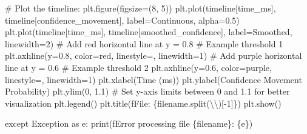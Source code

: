 \documentclass[
  letterpaper,
  DIV=11,
  numbers=noendperiod]{scrreprt}
\newenvironment{Shaded}{\begin{snugshade}}{\end{snugshade}}
\newcommand{\BuiltInTok}[1]{\textcolor[rgb]{0.00,0.23,0.31}{#1}}
\newcommand{\CharTok}[1]{\textcolor[rgb]{0.13,0.47,0.30}{#1}}
\newcommand{\CommentTok}[1]{\textcolor[rgb]{0.37,0.37,0.37}{#1}}
\newcommand{\ControlFlowTok}[1]{\textcolor[rgb]{0.00,0.23,0.31}{#1}}
\newcommand{\DecValTok}[1]{\textcolor[rgb]{0.68,0.00,0.00}{#1}}
\newcommand{\FloatTok}[1]{\textcolor[rgb]{0.68,0.00,0.00}{#1}}
\newcommand{\ImportTok}[1]{\textcolor[rgb]{0.00,0.46,0.62}{#1}}
\newcommand{\NormalTok}[1]{\textcolor[rgb]{0.00,0.23,0.31}{#1}}
\newcommand{\OperatorTok}[1]{\textcolor[rgb]{0.37,0.37,0.37}{#1}}
\newcommand{\PreprocessorTok}[1]{\textcolor[rgb]{0.68,0.00,0.00}{#1}}
\newcommand{\SpecialCharTok}[1]{\textcolor[rgb]{0.37,0.37,0.37}{#1}}
\newcommand{\SpecialStringTok}[1]{\textcolor[rgb]{0.13,0.47,0.30}{#1}}
\newcommand{\StringTok}[1]{\textcolor[rgb]{0.13,0.47,0.30}{#1}}
\begin{document}
\begin{Shaded}
\begin{Highlighting}[]
        \CommentTok{\# Plot the timeline:}
\NormalTok{        plt.figure(figsize}\OperatorTok{=}\NormalTok{(}\DecValTok{8}\NormalTok{, }\DecValTok{5}\NormalTok{))}
\NormalTok{        plt.plot(timeline[}\StringTok{\textquotesingle{}time\_ms\textquotesingle{}}\NormalTok{], timeline[}\StringTok{\textquotesingle{}confidence\_movement\textquotesingle{}}\NormalTok{], label}\OperatorTok{=}\StringTok{\textquotesingle{}Continuous\textquotesingle{}}\NormalTok{, alpha}\OperatorTok{=}\FloatTok{0.5}\NormalTok{)}
\NormalTok{        plt.plot(timeline[}\StringTok{\textquotesingle{}time\_ms\textquotesingle{}}\NormalTok{], timeline[}\StringTok{\textquotesingle{}smoothed\_confidence\textquotesingle{}}\NormalTok{], label}\OperatorTok{=}\StringTok{\textquotesingle{}Smoothed\textquotesingle{}}\NormalTok{, linewidth}\OperatorTok{=}\DecValTok{2}\NormalTok{)}
        \CommentTok{\# Add red horizontal line at y = 0.8    \# Example threshold 1}
\NormalTok{        plt.axhline(y}\OperatorTok{=}\FloatTok{0.8}\NormalTok{, color}\OperatorTok{=}\StringTok{\textquotesingle{}red\textquotesingle{}}\NormalTok{, linestyle}\OperatorTok{=}\StringTok{\textquotesingle{}{-}{-}\textquotesingle{}}\NormalTok{, linewidth}\OperatorTok{=}\DecValTok{1}\NormalTok{)}
        \CommentTok{\# Add purple horizontal line at y = 0.6    \# Example threshold 2}
\NormalTok{        plt.axhline(y}\OperatorTok{=}\FloatTok{0.6}\NormalTok{, color}\OperatorTok{=}\StringTok{\textquotesingle{}purple\textquotesingle{}}\NormalTok{, linestyle}\OperatorTok{=}\StringTok{\textquotesingle{}{-}{-}\textquotesingle{}}\NormalTok{, linewidth}\OperatorTok{=}\DecValTok{1}\NormalTok{)}
\NormalTok{        plt.xlabel(}\StringTok{\textquotesingle{}Time (ms)\textquotesingle{}}\NormalTok{)}
\NormalTok{        plt.ylabel(}\StringTok{\textquotesingle{}Confidence Movement Probability\textquotesingle{}}\NormalTok{)}
\NormalTok{        plt.ylim(}\DecValTok{0}\NormalTok{, }\FloatTok{1.1}\NormalTok{)  }\CommentTok{\# Set y{-}axis limits between 0 and 1.1 for better visualization }
\NormalTok{        plt.legend()}
\NormalTok{        plt.title(}\SpecialStringTok{f\textquotesingle{}File: }\SpecialCharTok{\{}\NormalTok{filename}\SpecialCharTok{.}\NormalTok{split(}\StringTok{\textquotesingle{}}\CharTok{\textbackslash{}\textbackslash{}}\StringTok{\textquotesingle{}}\NormalTok{)[}\OperatorTok{{-}}\DecValTok{1}\NormalTok{]}\SpecialCharTok{\}}\SpecialStringTok{\textquotesingle{}}\NormalTok{)}
\NormalTok{        plt.show()}

    \ControlFlowTok{except} \PreprocessorTok{Exception} \ImportTok{as}\NormalTok{ e:}
        \BuiltInTok{print}\NormalTok{(}\SpecialStringTok{f\textquotesingle{}Error processing file }\SpecialCharTok{\{}\NormalTok{filename}\SpecialCharTok{\}}\SpecialStringTok{: }\SpecialCharTok{\{}\NormalTok{e}\SpecialCharTok{\}}\SpecialStringTok{\textquotesingle{}}\NormalTok{)}
\end{Highlighting}
\end{Shaded}
\end{document}
